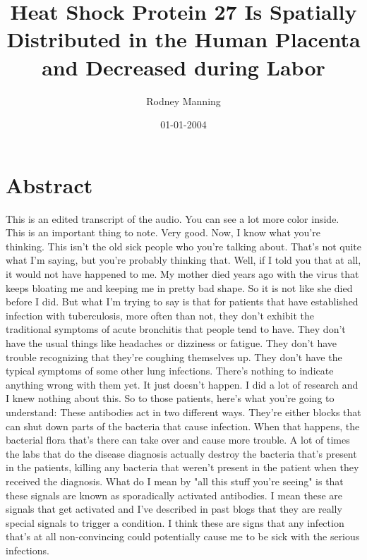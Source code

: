 \documentclass{article}%
\title{Heat Shock Protein 27 Is Spatially Distributed in the Human Placenta and Decreased during Labor}%
\author{Rodney Manning}%
\affil{Department of Minimally Invasive Surgery, The First Affiliated Hospital of Nanjing Medical University, Nanjing 210029, P.R. China}%
\date{01{-}01{-}2004}%
\begin{document}
%
\normalsize%
\maketitle%
\section{Abstract}%
\label{sec:Abstract}%
This is an edited transcript of the audio.\newline%
You can see a lot more color inside. This is an important thing to note. Very good.\newline%
Now, I know what you're thinking. This isn't the old sick people who you're talking about. That's not quite what I'm saying, but you're probably thinking that.\newline%
Well, if I told you that at all, it would not have happened to me. My mother died years ago with the virus that keeps bloating me and keeping me in pretty bad shape. So it is not like she died before I did.\newline%
But what I'm trying to say is that for patients that have established infection with tuberculosis, more often than not, they don't exhibit the traditional symptoms of acute bronchitis that people tend to have. They don't have the usual things like headaches or dizziness or fatigue. They don't have trouble recognizing that they're coughing themselves up. They don't have the typical symptoms of some other lung infections. There's nothing to indicate anything wrong with them yet. It just doesn't happen. I did a lot of research and I knew nothing about this.\newline%
So to those patients, here's what you're going to understand: These antibodies act in two different ways. They're either blocks that can shut down parts of the bacteria that cause infection. When that happens, the bacterial flora that's there can take over and cause more trouble. A lot of times the labs that do the disease diagnosis actually destroy the bacteria that's present in the patients, killing any bacteria that weren't present in the patient when they received the diagnosis.\newline%
What do I mean by "all this stuff you're seeing" is that these signals are known as sporadically activated antibodies. I mean these are signals that get activated and I've described in past blogs that they are really special signals to trigger a condition. I think these are signs that any infection that's at all non{-}convincing could potentially cause me to be sick with the serious infections.\newline%
\end{document}
